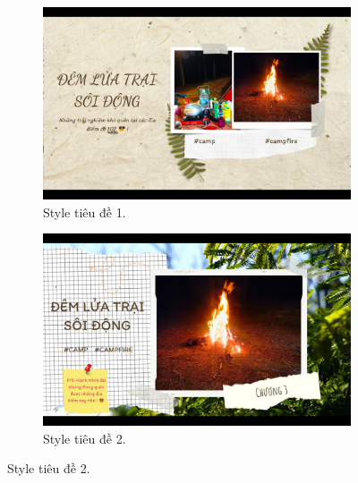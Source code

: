 \begin{enumerate}
    \begin{figure}[H]
        \centering
        \begin{subfigure}{0.48\textwidth}
            \includegraphics[width=1\linewidth]{figures/c4/4_1/title_1.jpg} 
            \caption{Style tiêu đề 1.}
        \end{subfigure}
        \hfill
        \begin{subfigure}{0.48\textwidth}
            \includegraphics[width=1\linewidth]{figures/c4/4_1/title_2.jpg} 
            \caption{Style tiêu đề 2.}
        \end{subfigure}
        

\end{figure}
\end{enumerate}
